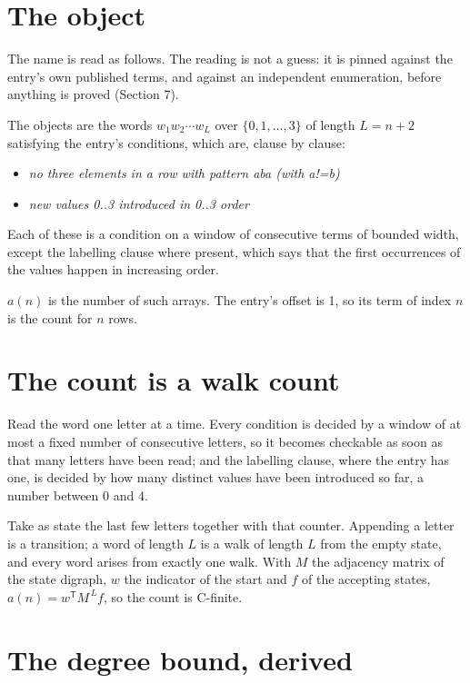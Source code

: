 \documentclass[11pt]{article}
\theoremstyle{definition}
\begin{document}
\section{The object}

The name is read as follows. The reading is not a guess: it is pinned against the entry's own published terms, and against an independent enumeration, before anything is proved (Section 7).

The objects are the words $w_1 w_2 \cdots w_L$ over $\{0,1,\dots,3\}$ of length $L = n + 2$ satisfying the entry's conditions, which are, clause by clause:

\begin{itemize}

\item {\itshape no three elements in a row with pattern aba (with a!=b)}

\item {\itshape new values 0..3 introduced in 0..3 order}

\end{itemize}

Each of these is a condition on a window of consecutive terms of bounded width, except the labelling clause where present, which says that the first occurrences of the values happen in increasing order.

$a(n)$ is the number of such arrays. The entry's offset is 1, so its term of index $n$ is the count for $n$ rows.

\section{The count is a walk count}

Read the word one letter at a time. Every condition is decided by a window of at most a fixed number of consecutive letters, so it becomes checkable as soon as that many letters have been read; and the labelling clause, where the entry has one, is decided by how many distinct values have been introduced so far, a number between $0$ and 4.

Take as state the last few letters together with that counter. Appending a letter is a transition; a word of length $L$ is a walk of length $L$ from the empty state, and every word arises from exactly one walk. With $M$ the adjacency matrix of the state digraph, $w$ the indicator of the start and $f$ of the accepting states, $a(n) = w^{\mathsf T}M^{\,L}f$, so the count is C-finite.

\section{The degree bound, derived}
\end{document}
